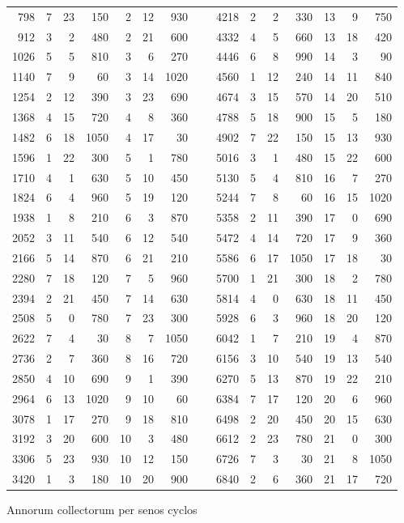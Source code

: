 \begin{tabnums}
\begin{tabular}[c]{@{} r rrr rrr c r rrr rrr@{}}
 798& 7& 23&  150&  2& 12&  930 &~& 4218& 2& ~2&  330& 13& ~9&  750\\
 912& 3& ~2&  480&  2& 21&  600 &~& 4332& 4& ~5&  660& 13& 18&  420\\
1026& 5& ~5&  810&  3& ~6&  270 &~& 4446& 6& ~8&  990& 14& ~3&   90\\
1140& 7& ~9&   60&  3& 14& 1020 &~& 4560& 1& 12&  240& 14& 11&  840\\
1254& 2& 12&  390&  3& 23&  690 &~& 4674& 3& 15&  570& 14& 20&  510\\
1368& 4& 15&  720&  4& ~8&  360 &~& 4788& 5& 18&  900& 15& ~5&  180\\
1482& 6& 18& 1050&  4& 17&   30 &~& 4902& 7& 22&  150& 15& 13&  930\\
1596& 1& 22&  300&  5& ~1&  780 &~& 5016& 3& ~1&  480& 15& 22&  600\\
1710& 4& ~1&  630&  5& 10&  450 &~& 5130& 5& ~4&  810& 16& ~7&  270\\
1824& 6& ~4&  960&  5& 19&  120 &~& 5244& 7& ~8&   60& 16& 15& 1020\\
1938& 1& ~8&  210&  6& ~3&  870 &~& 5358& 2& 11&  390& 17& ~0&  690\\
2052& 3& 11&  540&  6& 12&  540 &~& 5472& 4& 14&  720& 17& ~9&  360\\
2166& 5& 14&  870&  6& 21&  210 &~& 5586& 6& 17& 1050& 17& 18&   30\\
2280& 7& 18&  120&  7& ~5&  960 &~& 5700& 1& 21&  300& 18& ~2&  780\\
2394& 2& 21&  450&  7& 14&  630 &~& 5814& 4& ~0&  630& 18& 11&  450\\
2508& 5& ~0&  780&  7& 23&  300 &~& 5928& 6& ~3&  960& 18& 20&  120\\
2622& 7& ~4&   30&  8& ~7& 1050 &~& 6042& 1& ~7&  210& 19& ~4&  870\\
2736& 2& ~7&  360&  8& 16&  720 &~& 6156& 3& 10&  540& 19& 13&  540\\
2850& 4& 10&  690&  9& ~1&  390 &~& 6270& 5& 13&  870& 19& 22&  210\\
2964& 6& 13& 1020&  9& 10&   60 &~& 6384& 7& 17&  120& 20& ~6&  960\\
3078& 1& 17&  270&  9& 18&  810 &~& 6498& 2& 20&  450& 20& 15&  630\\
3192& 3& 20&  600& 10& ~3&  480 &~& 6612& 2& 23&  780& 21& ~0&  300\\
3306& 5& 23&  930& 10& 12&  150 &~& 6726& 7& ~3&   30& 21& ~8& 1050\\
3420& 1& ~3&  180& 10& 20&  900 &~& 6840& 2& ~6&  360& 21& 17&  720\\
\bottomrule
\end{tabular}
\caption{Annorum collectorum per senos cyclos}
\label{tab:p129a}
\end{tabnums}
